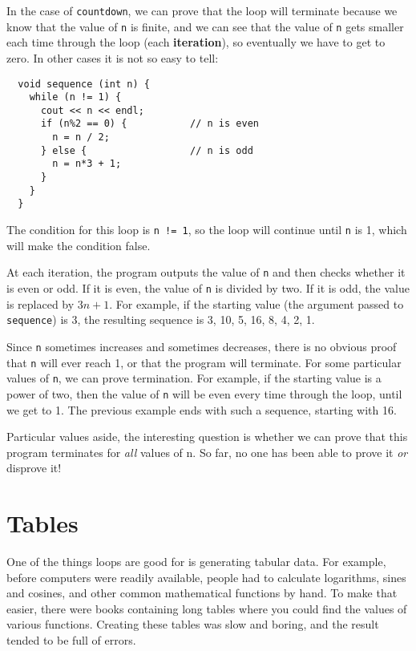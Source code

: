 In the case of {\tt countdown}, we can prove that the loop
will terminate because we know that the value of {\tt n} is
finite, and we can see that the value of {\tt n} gets smaller
each time through the loop (each {\bf iteration}), so
eventually we have to get to zero.  In other cases it is not
so easy to tell:

\begin{lstlisting}
  void sequence (int n) {
    while (n != 1) {
      cout << n << endl;
      if (n%2 == 0) {           // n is even
        n = n / 2;
      } else {                  // n is odd
        n = n*3 + 1;
      }
    }
  }
\end{lstlisting}
%
The condition for this loop is {\tt n != 1}, so the loop
will continue until {\tt n} is 1, which will make the condition
false.

At each iteration, the program outputs the value of {\tt n} and then
checks whether it is even or odd.  If it is even, the value of
{\tt n} is divided by two.  If it is odd, the value is replaced
by $3n+1$.  For example, if the starting value (the argument passed
to {\tt sequence}) is 3, the resulting sequence is
3, 10, 5, 16, 8, 4, 2, 1.

Since {\tt n} sometimes increases and sometimes decreases, there is no
obvious proof that {\tt n} will ever reach 1, or that the program will
terminate.  For some particular values of {\tt n}, we can prove
termination.  For example, if the starting value is a power of two, then
the value of {\tt n} will be even every time through the loop, until
we get to 1.  The previous example ends with such a sequence,
starting with 16.

Particular values aside, the interesting question is whether
we can prove that this program terminates for {\em all} values of n.
So far, no one has been able to prove it {\em or} disprove it!

\section{Tables}

One of the things loops are good for is generating
tabular data.  For example, before computers were readily available,
people had to calculate logarithms, sines and cosines, and other
common mathematical functions by hand.
To make that easier, there were books containing long tables
where you could find the values of various functions.
Creating these tables was slow and boring, and the result
tended to be full of errors.

